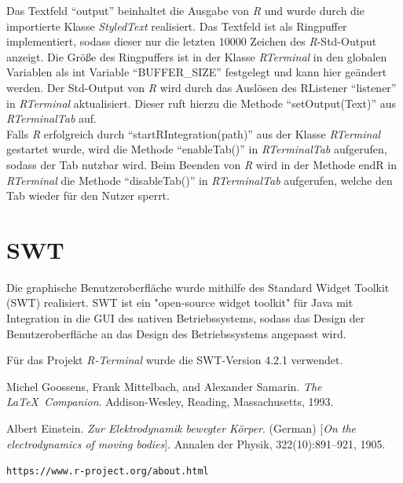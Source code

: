 \documentclass[a4paper, 12pt]{report} %
\begin{document}
Das Textfeld "`output"' beinhaltet die Ausgabe von \textit{R} und wurde durch die importierte Klasse \textit{StyledText} realisiert. Das Textfeld ist als Ringpuffer implementiert, sodass dieser nur die letzten $10000$ Zeichen des \textit{R}-Std-Output anzeigt. Die Größe des Ringpuffers ist in der Klasse \textit{RTerminal} in den globalen Variablen als int Variable "`BUFFER\_SIZE"' festgelegt und kann hier geändert werden.
Der Std-Output von \textit{R} wird durch das Auslösen des RListener "`listener"' in \textit{RTerminal} aktualisiert. Dieser ruft hierzu die Methode "`setOutput(Text)"' aus \textit{RTerminalTab} auf.\\

Falls \textit{R} erfolgreich durch "`startRIntegration(path)"' aus der Klasse \textit{RTerminal} gestartet wurde, wird die Methode "`enableTab()"' in \textit{RTerminalTab} aufgerufen, sodass der Tab nutzbar wird. Beim Beenden von \textit{R} wird in der Methode endR in  \textit{RTerminal} die Methode "`disableTab()"' in \textit{RTerminalTab} aufgerufen, welche den Tab wieder für den Nutzer sperrt.




\section{SWT}\label{swt} 
Die graphische Benutzeroberfläche wurde mithilfe des Standard Widget Toolkit (SWT) realisiert. SWT ist ein "open-source widget toolkit" für Java mit Integration in die GUI des nativen Betriebssystems, sodass das Design der Benutzeroberfläche an das Design des Betriebssystems angepasst wird. 

Für das Projekt \textit{R-Terminal} wurde die SWT-Version 4.2.1 verwendet.








%

%
\begin{thebibliography}{9} %
Michel Goossens, Frank Mittelbach, and Alexander Samarin. 
\textit{The \LaTeX\ Companion}. 
Addison-Wesley, Reading, Massachusetts, 1993.
 
Albert Einstein. 
\textit{Zur Elektrodynamik bewegter K{\"o}rper}. (German) 
[\textit{On the electrodynamics of moving bodies}]. 
Annalen der Physik, 322(10):891–921, 1905.

 
\texttt{https://www.r-project.org/about.html}
\end{thebibliography}
\end{document}
